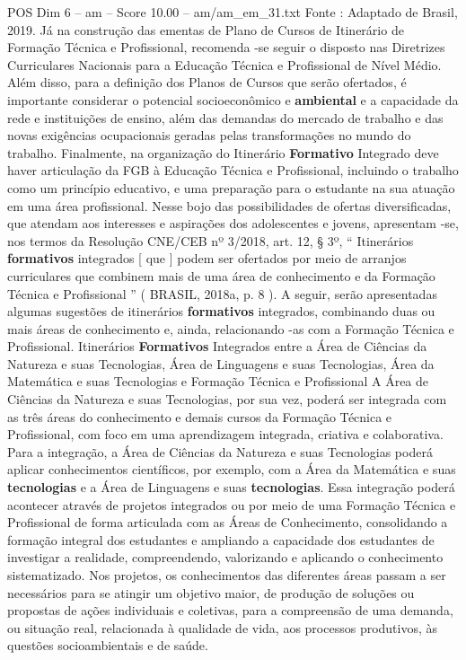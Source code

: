 \begin{textsample}{POS Dim 6 – am – Score 10.00 – am/am\_em\_31.txt}
Fonte : Adaptado de Brasil, 2019.
Já na construção das ementas de Plano de Cursos de Itinerário de Formação Técnica e Profissional, recomenda -se seguir o disposto nas Diretrizes Curriculares Nacionais para a Educação Técnica e Profissional de Nível Médio.
Além disso, para a definição dos Planos de Cursos que serão ofertados, é importante considerar o potencial socioeconômico e \textbf{ambiental} e a capacidade da rede e instituições de ensino, além das demandas do mercado de trabalho e das novas exigências ocupacionais geradas pelas transformações no mundo do trabalho.
Finalmente, na organização do Itinerário \textbf{Formativo} Integrado deve haver articulação da FGB à Educação Técnica e Profissional, incluindo o trabalho como um princípio educativo, e uma preparação para o estudante na sua atuação em uma área profissional.
Nesse bojo das possibilidades de ofertas diversificadas, que atendam aos interesses e aspirações dos adolescentes e jovens, apresentam -se, nos termos da Resolução CNE/CEB nº 3/2018, art. 12, § 3º, “ Itinerários \textbf{formativos} integrados [ que ] podem ser ofertados por meio de arranjos curriculares que combinem mais de uma área de conhecimento e da Formação Técnica e Profissional ” ( BRASIL, 2018a, p. 8 ).
A seguir, serão apresentadas algumas sugestões de itinerários \textbf{formativos} integrados, combinando duas ou mais áreas de conhecimento e, ainda, relacionando -as com a Formação Técnica e Profissional.
Itinerários \textbf{Formativos} Integrados entre a Área de Ciências da Natureza e suas Tecnologias, Área de Linguagens e suas Tecnologias, Área da Matemática e suas Tecnologias e Formação Técnica e Profissional A Área de Ciências da Natureza e suas Tecnologias, por sua vez, poderá ser integrada com as três áreas do conhecimento e demais cursos da Formação Técnica e Profissional, com foco em uma aprendizagem integrada, criativa e colaborativa.
Para a integração, a Área de Ciências da Natureza e suas Tecnologias poderá aplicar conhecimentos científicos, por exemplo, com a Área da Matemática e suas \textbf{tecnologias} e a Área de Linguagens e suas \textbf{tecnologias}.
Essa integração poderá acontecer através de projetos integrados ou por meio de uma Formação Técnica e Profissional de forma articulada com as Áreas de Conhecimento, consolidando a formação integral dos estudantes e ampliando a capacidade dos estudantes de investigar a realidade, compreendendo, valorizando e aplicando o conhecimento sistematizado.
Nos projetos, os conhecimentos das diferentes áreas passam a ser necessários para se atingir um objetivo maior, de produção de soluções ou propostas de ações individuais e coletivas, para a compreensão de uma demanda, ou situação real, relacionada à qualidade de vida, aos processos produtivos, às questões socioambientais e de saúde.

\end{textsample}
